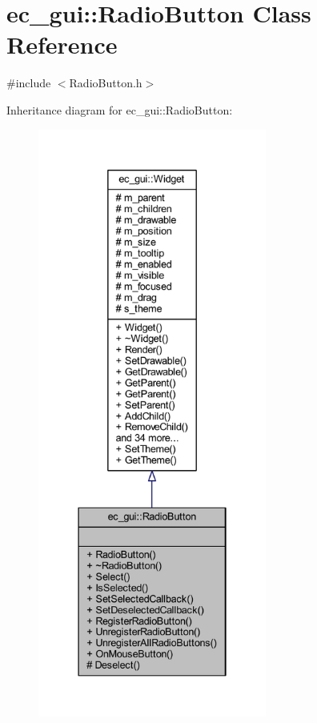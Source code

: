\hypertarget{classec__gui_1_1_radio_button}{}\section{ec\+\_\+gui\+:\+:Radio\+Button Class Reference}
\label{classec__gui_1_1_radio_button}


{\ttfamily \#include $<$Radio\+Button.\+h$>$}



Inheritance diagram for ec\+\_\+gui\+:\+:Radio\+Button\+:\nopagebreak
\begin{figure}[H]
\begin{center}
\leavevmode
\includegraphics[height=550pt]{classec__gui_1_1_radio_button__inherit__graph}
\end{center}
\end{figure}


